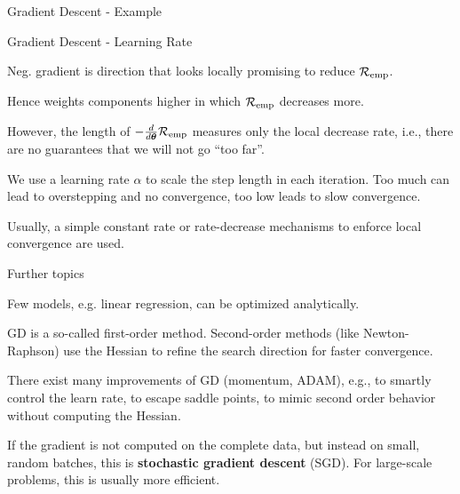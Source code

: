 \documentclass[11pt,compress,t,notes=noshow, xcolor=table]{beamer}
\begin{document}
\begin{frame2}{Gradient Descent - Example}
\vfill
{}
\end{frame2}


\begin{framei}[fs=footnotesize]{Gradient Descent - Learning Rate}
\item Neg. gradient is direction that looks locally promising to reduce $\mathcal{R}_{\text{emp}}$.
\item Hence weights components higher in which $\mathcal{R}_{\text{emp}}$ decreases more.
\item However, the length of $-\frac{d}{d\bm{\theta}}{\mathcal{R}_{\text{emp}}}$ measures only the local decrease rate, i.e., there are no guarantees that we will not go ``too far''.
\item We use a learning rate $\alpha$ to scale the step length in each iteration. Too much can lead to overstepping and no convergence, too low leads to slow convergence.
\item Usually, a simple constant rate or rate-decrease mechanisms to enforce local convergence are used.
\begin{figure}[!htb]
\end{figure}
\end{framei}

\begin{framei}{Further topics}
\item Few models, e.g. linear regression, can be optimized analytically. 
\item GD is a so-called first-order method. Second-order methods (like Newton-Raphson) use the Hessian to refine the search direction for faster convergence.
\item There exist many improvements of GD (momentum, ADAM), e.g., to smartly control the learn rate, to escape saddle points, to mimic second order behavior without computing the Hessian.
\item If the gradient is not computed on the complete data, but instead on small, random batches, this is \textbf{stochastic gradient descent} (SGD). For large-scale problems, this is usually more efficient.
\end{framei}

\endlecture
\end{document}
